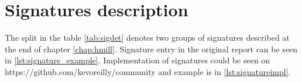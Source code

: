 \chapter{Signatures description} \label{app:signatures}
The split in the table \ref{tab:sigdet} denotes two groups of signatures described at the end of chapter \ref{chap:hmill}.
Signature entry in the original report can be seen in \ref{lst:signature_example}. Implementation of signatures could be seen on https://github.com/kevoreilly/community and example is in \ref{lst:signatureimpl}.

\newpage


